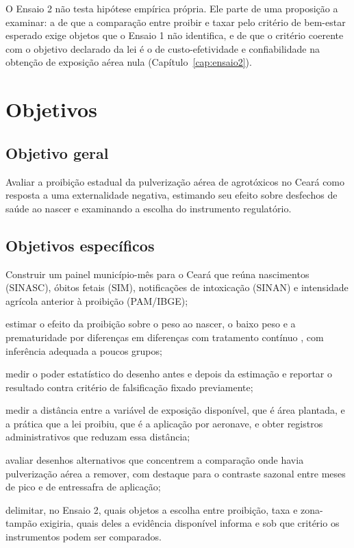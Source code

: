 O Ensaio 2 não testa hipótese empírica própria. Ele parte de uma proposição a
examinar: a de que a comparação entre proibir e taxar pelo critério de
bem-estar esperado \cite{weitzman1974} exige objetos que o Ensaio 1 não
identifica, e de que o critério coerente com o objetivo declarado da lei é o de
custo-efetividade e confiabilidade na obtenção de exposição aérea nula
(Capítulo~\ref{cap:ensaio2}).

\section{Objetivos}
\label{sec:objetivos}

\subsection{Objetivo geral}

Avaliar a proibição estadual da pulverização aérea de agrotóxicos no Ceará como
resposta a uma externalidade negativa, estimando seu efeito sobre desfechos de
saúde ao nascer e examinando a escolha do instrumento regulatório.

\subsection{Objetivos específicos}

\begin{alineas}
  \item Construir um painel município-mês para o Ceará que reúna nascimentos
    (SINASC), óbitos fetais (SIM), notificações de intoxicação (SINAN) e
    intensidade agrícola anterior à proibição (PAM/IBGE);
  \item estimar o efeito da proibição sobre o peso ao nascer, o baixo peso e a
    prematuridade por diferenças em diferenças com tratamento contínuo
    \cite{callaway2024continuous}, com inferência adequada a poucos grupos;
  \item medir o poder estatístico do desenho antes e depois da estimação e
    reportar o resultado contra critério de falsificação fixado previamente;
  \item medir a distância entre a variável de exposição disponível, que é área
    plantada, e a prática que a lei proibiu, que é a aplicação por aeronave, e
    obter registros administrativos que reduzam essa distância;
  \item avaliar desenhos alternativos que concentrem a comparação onde havia
    pulverização aérea a remover, com destaque para o contraste sazonal entre
    meses de pico e de entressafra de aplicação;
  \item delimitar, no Ensaio 2, quais objetos a escolha entre proibição, taxa e
    zona-tampão exigiria, quais deles a evidência disponível informa e sob que
    critério os instrumentos podem ser comparados.
\end{alineas}

